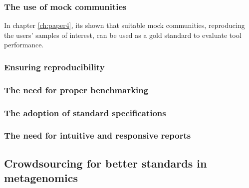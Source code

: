 \subsubsection{The use of mock communities}

In chapter \ref{ch:paper4}, its shown that suitable mock communities, reproducing the users’ samples of interest, can be used as a gold standard to evaluate tool performance. 

\subsubsection{Ensuring reproducibility}

\subsubsection{The need for proper benchmarking}

\subsubsection{The adoption of standard specifications}

\subsubsection{The need for intuitive and responsive reports}

\subsection{Crowdsourcing for better standards in metagenomics}